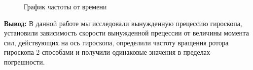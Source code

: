 \documentclass[a4paper, 12pt]{article}%
\begin{document}
	\begin{figure}[H]
		\caption{График частоты от времени}
		\end{figure}
	
	
		\textbf{Вывод:}
	В данной работе мы исследовали вынужденную прецессию гироскопа, установили зависимость скорости вынужденной прецессии от величины момента сил, действующих на ось гироскопа, определили частоту вращения ротора гироскопа 2 способами и получили одинаковые значения в пределах погрешности.
	

	
\end{document}

